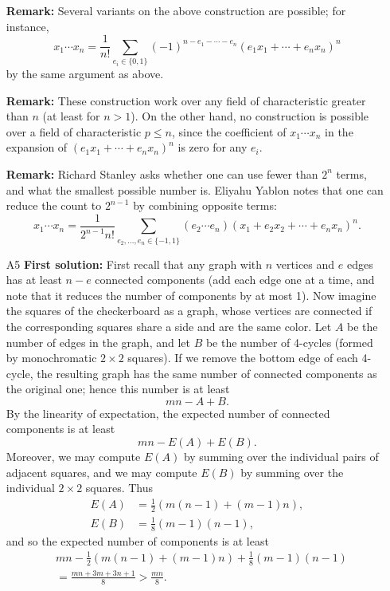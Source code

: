 \documentclass[amssymb,twocolumn,pra,10pt,aps]{revtex4-1}
\begin{document}
\begin{itemize}
\textbf{Remark:} Several variants on the above construction
are possible; for instance,
\[
x_1 \cdots x_n = \frac{1}{n!}
\sum_{e_i \in \{0,1\}} (-1)^{n - e_1 - \cdots - e_n}
(e_1 x_1 + \cdots + e_n x_n)^n
\]
by the same argument as above.

\textbf{Remark:} These construction work over any field of characteristic
greater than $n$ (at least for $n>1$).
On the other hand, no construction is possible over
a field of characteristic $p \leq n$, since the coefficient of
$x_1\cdots x_n$ in the expansion of
$(e_1 x_1 + \cdots + e_n x_n)^n$ is zero for any $e_i$.

\textbf{Remark:} Richard Stanley asks whether one can use fewer than
$2^n$ terms, and what the smallest possible number is. Eliyahu Yablon notes that one can reduce the count to $2^{n-1}$ by combining opposite terms:
\[
x_1 \cdots x_n = \frac{1}{2^{n-1} n!} \sum_{e_2,\dots,e_n \in \{-1,1\}}
(e_2\cdots e_n) (x_1 + e_2 x_2 + \cdots + e_n x_n)^n.
\]

\item[A5]
\textbf{First solution:}
First recall that any graph with $n$ vertices and $e$ edges has at
least $n-e$ connected components (add each edge one at a time, and note
that it reduces the number of components by at most 1). Now
imagine the squares of the checkerboard as a graph, whose vertices are
connected if the corresponding squares share a side and are
the same color. Let
$A$ be the number of edges in the graph, and let $B$ be the number of
4-cycles (formed by monochromatic $2 \times 2$ squares).
If we remove the bottom edge of each 4-cycle, the resulting graph has
the same number of connected components as the original one;
hence this number is at least
\[
mn - A+B.
\]
By the linearity of expectation, the expected number of connected
components is at least
\[
mn - E(A) + E(B).
\]
Moreover, we may compute $E(A)$ by summing over the individual
pairs of adjacent squares, and we may compute $E(B)$ by summing over
the individual $2 \times 2$ squares. Thus
\begin{align*}
E(A) &= \frac{1}{2}(m(n-1) + (m-1)n), \\
E(B) &= \frac{1}{8}(m-1)(n-1),
\end{align*}
and so the expected number of components is at least
\begin{align*}
& mn - \frac{1}{2}(m(n-1)+(m-1)n) + \frac{1}{8}(m-1)(n-1) \\
&= \frac{mn + 3m + 3n + 1}{8} >
\frac{mn}{8}.
\end{align*}


\end{itemize}
\end{document}
